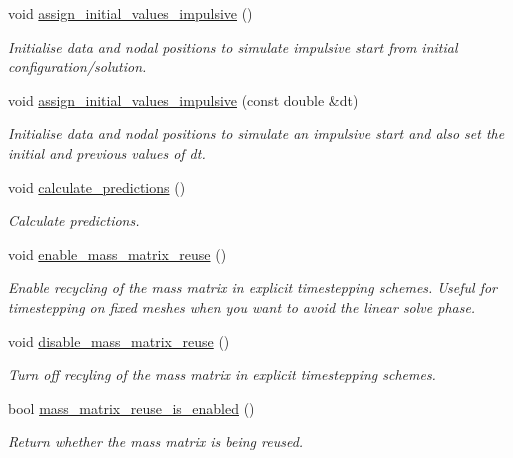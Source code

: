 \begin{DoxyCompactItemize}
void \hyperlink{classoomph_1_1Problem_a10e5dc4d944dfb2b141918e18e5e3de8}{assign\+\_\+initial\+\_\+values\+\_\+impulsive} ()
\begin{DoxyCompactList}\small\item\em Initialise data and nodal positions to simulate impulsive start from initial configuration/solution. \end{DoxyCompactList}\item 
void \hyperlink{classoomph_1_1Problem_a296bd0ba13bd51a96bb7057845e5a800}{assign\+\_\+initial\+\_\+values\+\_\+impulsive} (const double \&dt)
\begin{DoxyCompactList}\small\item\em Initialise data and nodal positions to simulate an impulsive start and also set the initial and previous values of dt. \end{DoxyCompactList}\item 
void \hyperlink{classoomph_1_1Problem_a474deeb0947b767566fa1d4630ad8b4a}{calculate\+\_\+predictions} ()
\begin{DoxyCompactList}\small\item\em Calculate predictions. \end{DoxyCompactList}\item 
void \hyperlink{classoomph_1_1Problem_a6a9e63d6e585eabe4e3e551f01f658ae}{enable\+\_\+mass\+\_\+matrix\+\_\+reuse} ()
\begin{DoxyCompactList}\small\item\em Enable recycling of the mass matrix in explicit timestepping schemes. Useful for timestepping on fixed meshes when you want to avoid the linear solve phase. \end{DoxyCompactList}\item 
void \hyperlink{classoomph_1_1Problem_a399ca4ccf551f9bf5621f9855e899af6}{disable\+\_\+mass\+\_\+matrix\+\_\+reuse} ()
\begin{DoxyCompactList}\small\item\em Turn off recyling of the mass matrix in explicit timestepping schemes. \end{DoxyCompactList}\item 
bool \hyperlink{classoomph_1_1Problem_afa46c693258868c126503cce3a663a85}{mass\+\_\+matrix\+\_\+reuse\+\_\+is\+\_\+enabled} ()
\begin{DoxyCompactList}\small\item\em Return whether the mass matrix is being reused. \end{DoxyCompactList}\item 

\end{DoxyCompactItemize}
